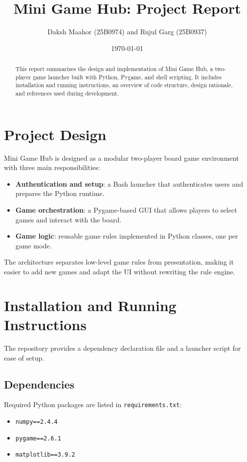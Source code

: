 \documentclass[12pt,a4paper]{article}
\title{Mini Game Hub: Project Report}
\author{Daksh Maahor (25B0974) and Rujul Garg (25B0937)}
\date{\today}
\begin{document}
\maketitle

\begin{abstract}
This report summarizes the design and implementation of Mini Game Hub, a two-player game launcher built with Python, Pygame, and shell scripting. It includes installation and running instructions, an overview of code structure, design rationale, and references used during development.
\end{abstract}

\section{Project Design}

Mini Game Hub is designed as a modular two-player board game environment with three main responsibilities:

\begin{itemize}
    \item \textbf{Authentication and setup}: a Bash launcher that authenticates users and prepares the Python runtime.
    \item \textbf{Game orchestration}: a Pygame-based GUI that allows players to select games and interact with the board.
    \item \textbf{Game logic}: reusable game rules implemented in Python classes, one per game mode.
\end{itemize}

The architecture separates low-level game rules from presentation, making it easier to add new games and adapt the UI without rewriting the rule engine.

\section{Installation and Running Instructions}

The repository provides a dependency declaration file and a launcher script for ease of setup.

\subsection{Dependencies}

Required Python packages are listed in \texttt{requirements.txt}:

\begin{itemize}
    \item \texttt{numpy==2.4.4}
    \item \texttt{pygame==2.6.1}
    \item \texttt{matplotlib==3.9.2}
\end{itemize}
\end{document}
